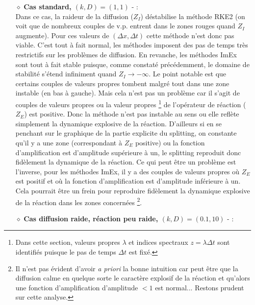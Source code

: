                 \begin{itemize}
                    \item[$\diamond$]\textbf{Cas standard, $(k,D)=(1,1)$} - :\\
                        Dans ce cas, la raideur de la diffusion ($Z_I$) déstabilise la méthode RKE2 (on voit que de nombreux couples de v.p. entrent dans le zones rouges quand $Z_I$ augmente).
                        Pour ces valeurs de $(\Delta x, \Delta t)$ cette méthode n'est donc pas viable.
                        C'est tout à fait normal, les méthodes imposent des pas de temps très restrictifs sur les problèmes de diffusion.
                        En revanche, les méthodes ImEx sont tout à fait stable puisque, comme constaté précédemment, le domaine de stabilité s'étend infiniment quand $Z_I \rightarrow -\infty$.
                        Le point notable est que certains couples de valeurs propres tombent malgré tout dans une zone instable (en bas à gauche). Mais cela n'est pas un problème car il s'agit 
                        de couples de valeurs propres ou la valeur propres
                        \footnote{Dans cette section, valeurs propres $\lambda$ et indices spectraux $z = \lambda \Delta t$ sont identifiés puisque le pas de temps $\Delta t$ est fixé.}
                        de l'opérateur de réaction ($Z_E$) est positive. Donc la méthode n'est pas instable au sens ou elle reflète simplement
                        la dynamique explosive de la réaction. D'ailleurs si en se penchant sur le graphique de la partie explicite du splitting, on constante qu'il y a une zone 
                        (correspondant à $Z_E$ positive) ou la fonction d'amplification est d'amplitude supérieure à un, le splitting reproduit donc fidèlement la dynamique de la réaction.
                        Ce qui peut être un problème est l'inverse, 
                        pour les méthodes ImEx, il y a des couples de valeurs propres où $Z_E$ est positif et où la fonction d'amplification est d'amplitude inférieure à un. 
                        Cela pourrait être un frein pour reproduire fidèlement la dynamique explosive de la réaction dans les zones concernées
                        \footnote{Il n'est pas évident d'avoir \textit{a priori} la bonne intuition car peut être que la diffusion calme en quelque sorte 
                        le caractère explosif de la réaction et qu'alors une fonction d'amplification d'amplitude $< 1$ est normal... Restons prudent sur cette analyse.}.
                    \item[$\diamond$]\textbf{Cas diffusion raide, réaction peu raide, $(k,D)=(0.1,10)$}  - :\\

\end{itemize}
